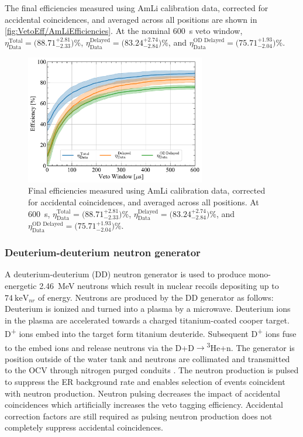 The final efficiencies measured using AmLi calibration data, corrected for accidental coincidences, and averaged across all positions are shown in \autoref{fig:VetoEff/AmLiEfficiencies}. At the nominal 600~\textmu s veto window, $\eta^\text{Total}_\text{Data}=\big(88.71^{+2.81}_{-2.33}\big)\%$, $\eta^\text{Delayed}_\text{Data}=\big(83.24^{+2.74}_{-2.84}\big)\%$, and $\eta^\text{OD Delayed}_\text{Data}=\big(75.71^{+1.93}_{-2.04}\big)\%$.

\begin{figure}[!ht]
    \centering
    \includegraphics[width=0.7\textwidth]{figures/VetoEfficiency/AmLiEfficiencies_Data.pdf}
    \caption[Final efficiencies measured using AmLi calibration data, corrected for accidental coincidences.]{Final efficiencies measured using AmLi calibration data, corrected for accidental coincidences, and averaged across all positions. At 600~\textmu s, $\eta^\text{Total}_\text{Data}=\big(88.71^{+2.81}_{-2.33}\big)\%$, $\eta^\text{Delayed}_\text{Data}=\big(83.24^{+2.74}_{-2.84}\big)\%$, and $\eta^\text{OD Delayed}_\text{Data}=\big(75.71^{+1.93}_{-2.04}\big)\%$.}
    \label{fig:VetoEff/AmLiEfficiencies}
\end{figure}

\subsubsection{Deuterium-deuterium neutron generator}
A deuterium-deuterium (DD) neutron generator is used to produce mono-energetic 2.46~MeV neutrons which result in nuclear recoils depositing up to $74~\text{keV}_{nr}$ of energy. Neutrons are produced by the DD generator as follows: Deuterium is ionized and turned into a plasma by a microwave. Deuterium ions in the plasma are accelerated towards a charged titanium-coated cooper target. D\textsuperscript{+} ions embed into the target form titanium deuteride. Subsequent D\textsuperscript{+} ions fuse to the embed ions and release neutrons via the D+D$\rightarrow$\textsuperscript{3}He+n. The generator is position outside of the water tank and neutrons are collimated and transmitted to the OCV through nitrogen purged conduits \cite{LZ:2024bsz}. The neutron production is pulsed to suppress the ER background rate and enables selection of events coincident with neutron production. Neutron pulsing decreases the impact of accidental coincidences which artificially increases the veto tagging efficiency. Accidental correction factors are still required as pulsing neutron production does not completely suppress accidental coincidences.

